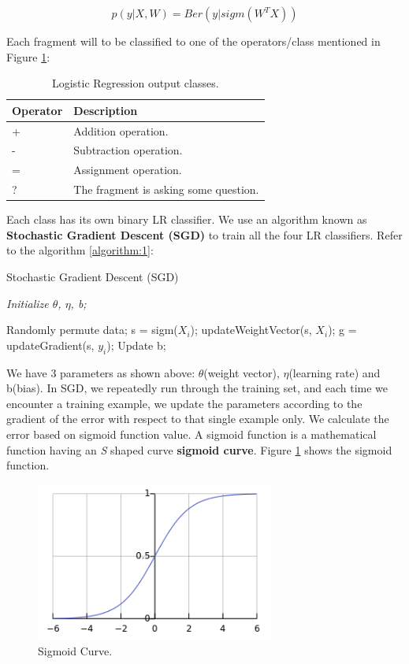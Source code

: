 \documentclass[11pt]{article}
\begin{document}
\begin{equation} p(y|X,W) = Ber(y|sigm(W^{T}X)) \end{equation}

Each fragment will to be classified to one of the operators/class mentioned in Figure \ref{figure:20}:

\begin{table}[h!]
\centering
\begin{tabular}{ | m{5em} | m{20em} |}
\hline
 \textbf{Operator} & \textbf{Description}\\
\hline
+ & Addition operation. \\
\hline
- & Subtraction operation. \\
\hline
= & Assignment operation. \\
\hline
? & The fragment is asking some question.\\
\hline
\end{tabular}
\caption{Logistic Regression output classes.}
\label{figure:20}
\end{table}

Each class has its own binary LR classifier. We use an algorithm known as \textbf{Stochastic Gradient Descent (SGD)} to train all the four LR classifiers. Refer to the algorithm \ref{algorithm:1}:

\begin{algorithm}
\caption{Stochastic Gradient Descent (SGD)}
\label{algorithm:1}
\textit{Initialize $\theta$, $\eta$, b;}
\begin{algorithmic}
\Repeat 
\State Randomly permute data;
\State s = sigm($X_{i}$);
\State updateWeightVector(s, $X_{i}$);
\State g = updateGradient(s, $y_{i}$);
\State Update b;
\EndFor
\Until
\end{algorithmic}
\end{algorithm}

We have 3 parameters as shown above: $\theta$(weight vector), $\eta$(learning rate) and b(bias). In SGD, we repeatedly run through the training set, and each time we encounter a training example, we update the parameters according to the gradient of the error with respect to that single example only. We calculate the error based on sigmoid function value. A sigmoid function is a mathematical function having an \textit{S} shaped curve \textbf{sigmoid curve}. Figure \ref{figure:21} shows the sigmoid function.

\begin{figure}[h!]
\includegraphics[width=0.7\textwidth]{Figure2}
\centering
\caption{Sigmoid Curve.}
\label{figure:21}
\end{figure}
\end{document}
